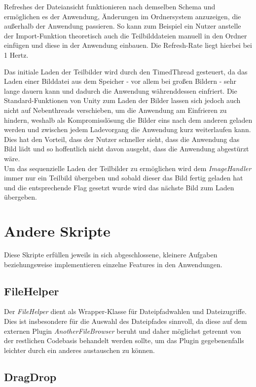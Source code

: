\documentclass[oneside]{ausarbeitung}
\begin{document}
Refreshes der Dateiansicht funktionieren nach demselben Schema und ermöglichen es der Anwendung, Änderungen im Ordnersystem anzuzeigen, die außerhalb der Anwendung passieren. So kann zum Beispiel ein Nutzer anstelle der Import-Funktion theoretisch auch die Teilbilddateien manuell in den Ordner einfügen und diese in der Anwendung einbauen. Die Refresh-Rate liegt hierbei bei 1 Hertz.

Das initiale Laden der Teilbilder wird durch den TimedThread gesteuert, da das Laden einer Bilddatei aus dem Speicher - vor allem bei großen Bildern - sehr lange dauern kann und dadurch die Anwendung währenddessen einfriert. Die Standard-Funktionen von Unity zum Laden der Bilder lassen sich jedoch auch nicht auf Nebenthreads verschieben, um die Anwendung am Einfrieren zu hindern, weshalb als Kompromisslösung die Bilder eins nach dem anderen geladen werden und zwischen jedem Ladevorgang die Anwendung kurz weiterlaufen kann. Dies hat den Vorteil, dass der Nutzer schneller sieht, dass die Anwendung das Bild lädt und so hoffentlich nicht davon ausgeht, dass die Anwendung abgestürzt wäre.\\
Um das sequenzielle Laden der Teilbilder zu ermöglichen wird dem \textit{ImageHandler} immer nur ein Teilbild übergeben und sobald dieser das Bild fertig geladen hat und die entsprechende Flag gesetzt wurde wird das nächste Bild zum Laden übergeben.



\section{Andere Skripte}

Diese Skripte erfüllen jeweils in sich abgeschlossene, kleinere Aufgaben beziehungsweise implementieren einzelne Features in den Anwendungen.



\subsection{FileHelper}

Der \textit{FileHelper} dient als Wrapper-Klasse für Dateipfadwahlen und Dateizugriffe. Dies ist insbesondere für die Auswahl des Dateipfades sinnvoll, da diese auf dem externen Plugin \textit{AnotherFileBrowser} beruht und daher möglichst getrennt von der restlichen Codebasis behandelt werden sollte, um das Plugin gegebenenfalls leichter durch ein anderes austauschen zu können.


\subsection{DragDrop}
\end{document}
